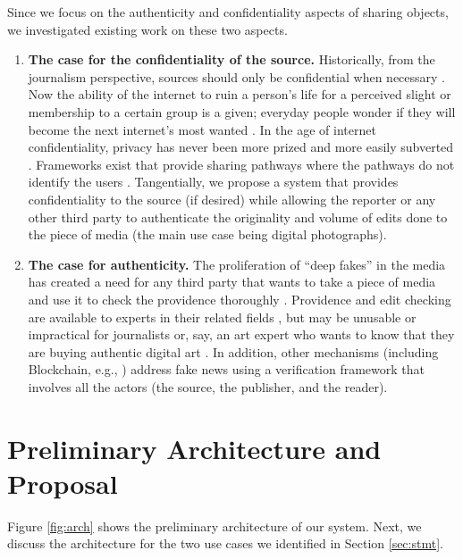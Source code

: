 \documentclass[10pt]{article}
\begin{document}
Since we focus on the authenticity and confidentiality aspects of sharing objects, we investigated existing work on these two aspects. 

\begin{enumerate}
\item {\bf The case for the confidentiality of the source. } Historically, from the journalism perspective, sources should only be confidential when necessary \cite{wulfemeyer83}. Now the ability of the internet to ruin a person's life for a perceived slight or membership to a certain group is a given; everyday people wonder if they will become the next internet's most wanted \cite{svana18}. In the age of internet confidentiality, privacy has never been more prized and more easily subverted \cite{durity05,svana18}. Frameworks exist that provide sharing pathways where the pathways do not identify the users \cite{cvppfr19, tccn13}. Tangentially, we propose a system that provides confidentiality to the source (if desired) while allowing the reporter or any other third party to authenticate the originality and volume of edits done to the piece of media (the main use case being digital photographs).
\item {\bf The case for authenticity.} The proliferation of ``deep fakes'' in the media has created a need for any third party that wants to take a piece of media and use it to check the providence thoroughly \cite{ckdg20}. Providence and edit checking are available to experts in their related fields \cite{cooper10}, but may be unusable or impractical for journalists or, say, an art expert who wants to know that they are buying authentic digital art \cite{wlwc21}. In addition, other mechanisms (including Blockchain, e.g., \cite{qqjs19}) address fake news using a verification framework that involves all the actors (the source, the publisher, and the reader).  
\end{enumerate}

\section{Preliminary Architecture and Proposal}

Figure \ref{fig:arch} shows the preliminary architecture of our system. Next, we discuss the architecture for the two use cases we identified in Section \ref{sec:stmt}.
\end{document}
